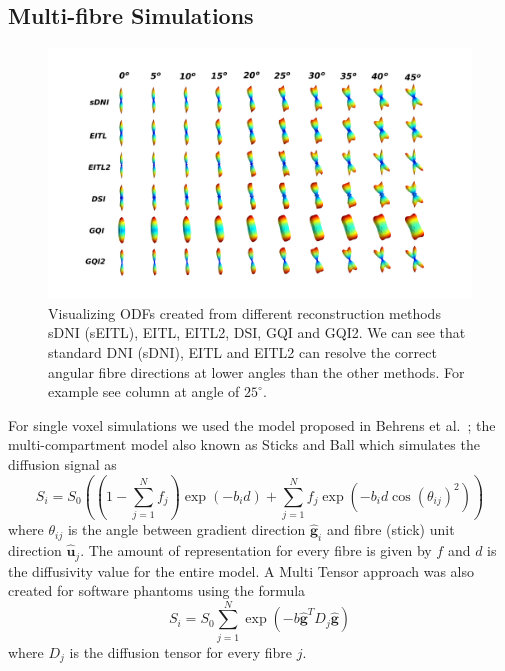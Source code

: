 \documentclass{bioinfo}
\begin{document}
\subsection{Multi-fibre Simulations\label{sub:Multi-fiber-Simulations}}

%
\begin{figure}
[th!]

\centering{}\includegraphics[scale=0.6]{figures/low_angles_with_labels}\caption{Visualizing ODFs created from different reconstruction methods sDNI
(sEITL), EITL, EITL2, DSI, GQI and GQI2. We can see that standard
DNI (sDNI), EITL and EITL2 can resolve the correct angular fibre directions
at lower angles than the other methods. For example see column at
angle of $25^{\circ}$. }
\label{Flo:multi-fibre-sims}
\end{figure}


For single voxel simulations we used the model proposed in Behrens
et al.~\cite{Behrens2007NeuroImage}; the multi-compartment model
also known as Sticks and Ball which simulates the diffusion signal
as\begin{equation}
S_{i}=S_{0}((1-\sum_{j=1}^{N}f_{j})\exp(-b_{i}d)+\sum_{j=1}^{N}f_{j}\exp(-b_{i}d\cos(\theta_{ij})^{2}))\label{eq:sticks_ball_eq}\end{equation}
\noindent where $\theta_{ij}$ is the angle between gradient direction
$\mathbf{\hat{g}}_{i}$ and fibre (stick) unit direction $\mathbf{\hat{u}}_{j}$.
The amount of representation for every fibre is given by $f$ and
$d$ is the diffusivity value for the entire model. A Multi Tensor
\cite{liu2004characterizing} approach was also created for software
phantoms using the formula\foreignlanguage{british}{\begin{equation}
S_{i}=S_{0}\sum_{j=1}^{N}\exp(-b\mathbf{\hat{g}}^{T}D_{j}\mathbf{\hat{g}})\label{eq:multitensor}\end{equation}
where $D_{j}$ is the diffusion tensor for every fibre $j$.}
\end{document}
